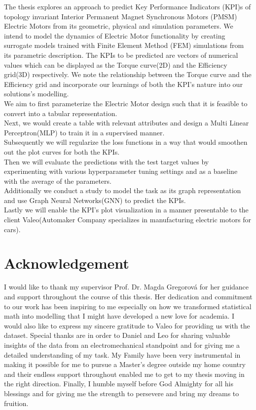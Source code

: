 \documentclass{report} %
\begin{document}
The thesis explores an approach to predict Key Performance Indicators (KPI)s of topology invariant Interior Permanent Magnet Synchronous Motors 
(PMSM) Electric Motors from its geometric, physical and simulation parameters.
We intend to model the dynamics of Electric Motor functionality by creating surrogate models trained with Finite Element Method (FEM) simulations from its parametric description.
The KPIs to be predicted are vectors of numerical values which can be displayed as the Torque curve(2D) and the Efficiency grid(3D) respectively.
We note the relationship between the Torque curve and the Efficiency grid and incorporate our learnings of both the KPI's nature into our solutions's modelling. \\
We aim to first parameterize the Electric Motor design such that it is feasible to convert into a tabular representation. \\
Next, we would create a table with relevant attributes and design a Multi Linear Perceptron(MLP) to train it in a supervised manner.\\
Subsequently we will regularize the loss functions in a way that would smoothen out the plot curves for both the KPIs. \\
Then we will evaluate the predictions with the test target values by experimenting with various hyperparameter tuning settings 
and as a baseline with the average of the parameters.\\
Additionally we conduct a study to model the task as its graph representation and use Graph Neural Networks(GNN) to predict the KPIs.\\
Lastly we will enable the KPI's plot visualization in a manner presentable to the client Valeo(Automaker Company specializes in manufacturing electric motors for cars).\\

\newpage 

\newpage 

\chapter*{Acknowledgement}
I would like to thank my supervisor Prof. Dr. Magda Gregorová for her guidance and support throughout the course of this thesis.
Her dedication and commitment to our work has been inspiring to me especially on how we transformed statistical math into modelling that I might have developed a 
new love for academia. I would also like to express my sincere gratitude to Valeo for providing us with the dataset.
Special thanks are in order to Daniel and Leo for sharing valuable insights of the data from an electromechanical standpoint and for giving me a detailed understanding 
of my task. My Family have been very instrumental in making it possible for me to pursue a Master's degree outside my home country and their endless support throughout 
enabled me to get to my thesis moving in the right direction. Finally, I humble myself before God Almighty for all his blessings and for giving me the strength 
to persevere and bring my dreams to fruition.
\end{document}
